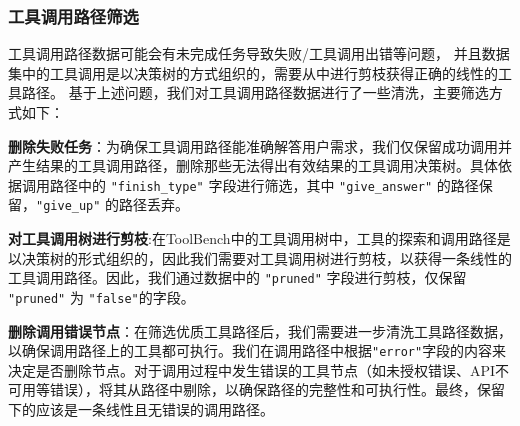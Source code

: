 \subsubsection{工具调用路径筛选}

工具调用路径数据可能会有未完成任务导致失败/工具调用出错等问题，
并且数据集中的工具调用是以决策树的方式组织的，需要从中进行剪枝获得正确的线性的工具路径。
基于上述问题，我们对工具调用路径数据进行了一些清洗，主要筛选方式如下：

\textbf{删除失败任务}：为确保工具调用路径能准确解答用户需求，我们仅保留成功调用并产生结果的工具调用路径，删除那些无法得出有效结果的工具调用决策树。具体依据调用路径中的 \texttt{"finish\_type"} 字段进行筛选，其中 \texttt{"give\_answer"} 的路径保留，\texttt{"give\_up"} 的路径丢弃。

\textbf{对工具调用树进行剪枝}:在ToolBench中的工具调用树中，工具的探索和调用路径是以决策树的形式组织的，因此我们需要对工具调用树进行剪枝，以获得一条线性的工具调用路径。因此，我们通过数据中的 \texttt{"pruned"} 字段进行剪枝，仅保留 \texttt{"pruned"} 为 \texttt{"false"}的字段。

\textbf{删除调用错误节点}：在筛选优质工具路径后，我们需要进一步清洗工具路径数据，以确保调用路径上的工具都可执行。我们在调用路径中根据\texttt{"error"}字段的内容来决定是否删除节点。对于调用过程中发生错误的工具节点（如未授权错误、API不可用等错误），将其从路径中剔除，以确保路径的完整性和可执行性。最终，保留下的应该是一条线性且无错误的调用路径。



